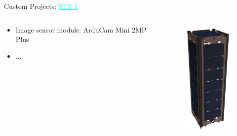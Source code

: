 \begin{frame}{Custom Projects: \href{http://stf1.com/}{\textcolor{cyan}{\underline{STF-1}}}}

    \begin{columns}[t]
        \begin{column}[t]{0.6\textwidth}
            \begin{itemize}
                \item Image sensor module: ArduCam Mini 2MP Plus
                \item ...
            \end{itemize}
        \end{column}
        \begin{column}[t]{0.4\textwidth}
            \begin{figure}[!ht]
                \begin{center}
                    \includegraphics[width=3cm]{figures/stf1_closed_top.png}
                \end{center}
            \end{figure}
        \end{column}
    \end{columns}

\end{frame}

